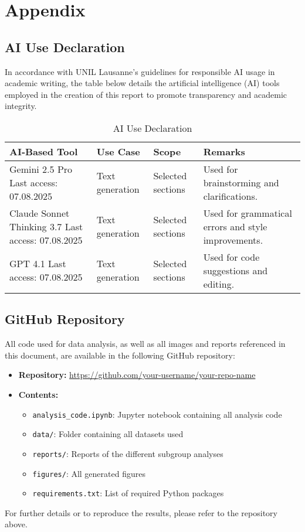 \appendix
\section{Appendix}
\label{appendix}
\subsection{AI Use Declaration}
In accordance with UNIL Lausanne's guidelines for responsible AI usage in academic writing, the table below details the artificial intelligence (AI) tools employed in the creation of this report to promote transparency and academic integrity.

\begin{table}[h!]
    \centering
    \caption{AI Use Declaration}
    \label{tab:ai_use_declaration}
    \begin{tabular}{@{}p{3cm} p{3cm} p{3cm} p{7cm}@{}}
        \toprule
        \textbf{AI-Based Tool} & \textbf{Use Case} & \textbf{Scope} & \textbf{Remarks} \\ \midrule
        Gemini 2.5 Pro \newline Last access: 07.08.2025 & Text generation & Selected sections & Used for brainstorming and clarifications. \\
        Claude Sonnet Thinking 3.7 \newline Last access: 07.08.2025 & Text generation & Selected sections & Used for grammatical errors and style improvements. \\
        GPT 4.1 \newline Last access: 07.08.2025 & Text generation & Selected sections & Used for code suggestions and editing. \\
        \bottomrule
    \end{tabular}
\end{table}


\subsection{GitHub Repository}
All code used for data analysis, as well as all images and reports referenced in this document, are available in the following GitHub repository:

\begin{itemize}
    \item \textbf{Repository:} \url{https://github.com/your-username/your-repo-name}
    \item \textbf{Contents:}
    \begin{itemize}
        \item \texttt{analysis\_code.ipynb}: Jupyter notebook containing all analysis code
        \item \texttt{data/}: Folder containing all datasets used
        \item \texttt{reports/}: Reports of the different subgroup analyses
        \item \texttt{figures/}: All generated figures
        \item \texttt{requirements.txt}: List of required Python packages
    \end{itemize}
\end{itemize}

For further details or to reproduce the results, please refer to the repository above.
